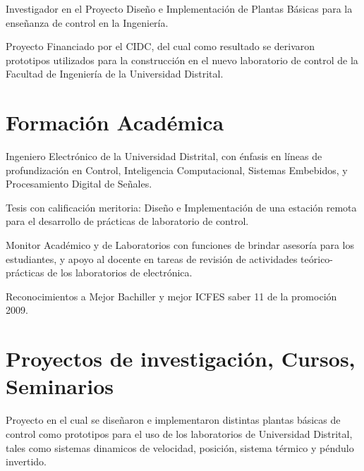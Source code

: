 \documentclass[]{deedy-resume-openfont}
\begin{document}
\begin{tightemize}
\item Investigador en el Proyecto Diseño e Implementación de Plantas Básicas para la enseñanza de control en la Ingeniería.
\item Proyecto Financiado por el CIDC, del cual como resultado se derivaron prototipos utilizados para la construcción en el nuevo laboratorio de control de la Facultad de Ingeniería de la Universidad Distrital.

\end{tightemize}

\sectionsep


\section{Formación Académica}
\begin{tightemize}
\item Ingeniero Electrónico de la Universidad Distrital, con énfasis en líneas de profundización en Control, Inteligencia Computacional, Sistemas Embebidos, y Procesamiento Digital de Señales.
\item  Tesis con calificación meritoria: Diseño e Implementación de una estación remota para el desarrollo de prácticas de laboratorio de control.
\item Monitor Académico y de Laboratorios con funciones de brindar asesoría para los estudiantes, y apoyo al docente en tareas de revisión de actividades teórico-prácticas de los laboratorios de electrónica.


\end{tightemize}
\sectionsep

\begin{tightemize}
\item Reconocimientos a Mejor Bachiller y mejor ICFES saber 11 de la promoción 2009.
\end{tightemize}

\sectionsep


\section{Proyectos de investigación, Cursos,
Seminarios}
Proyecto en el cual se diseñaron e implementaron distintas plantas básicas de control como prototipos para el uso de los laboratorios de Universidad Distrital, tales como sistemas dinamicos de velocidad, posición, sistema térmico y péndulo invertido. 
\sectionsep
\end{document}
